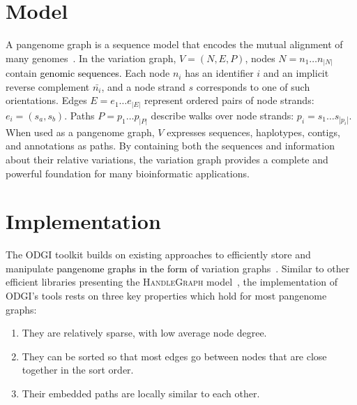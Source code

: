 \documentclass{bioinfo}
\newcommand{\REVIEWED}[1]{{\textcolor{Black}{#1}}}
\begin{document}
\section{Model}
A pangenome graph is a sequence model that encodes the mutual alignment of many genomes~\citep{Garrison_2019_thesis,Eizenga_2020}.
In the variation graph, $V = (N, E, P)$, nodes $N = n_1\ldots n_{|N|}$ contain \REVIEWED{genomic sequences.}
Each node $n_i$ has an identifier $i$ and an implicit reverse complement $\bar{n_i}$, and a node strand $s$ corresponds to one of such orientations.
Edges $E = e_1\ldots e_{|E|}$ represent ordered pairs of node strands: $e_i = ( s_a, s_b )$.
Paths $P = p_1\ldots p_{|P|}$ describe walks over node strands: $p_i = s_1 \ldots s_{|p_i|}$.
When used as a pangenome graph, $V$ expresses sequences, haplotypes, contigs, and annotations as paths.
By containing both the sequences and information about their relative variations, the variation graph provides a complete and powerful foundation for many bioinformatic applications.


\section{Implementation}
The ODGI toolkit builds on existing approaches to efficiently store and manipulate \REVIEWED{pangenome graphs in the form of} variation graphs~\citep{Garrison:2018}.
Similar to other efficient libraries presenting the \textsc{HandleGraph} model~\citep{Eizenga_2020_BX}, the implementation of ODGI's tools rests on three key properties which hold for most pangenome graphs:

\begin{enumerate}
\item They are relatively sparse, with low average node degree.
\item They can be sorted so that most edges go between nodes that are close together in the sort order.
\item Their embedded paths are locally similar to each other.
\end{enumerate}
\end{document}
